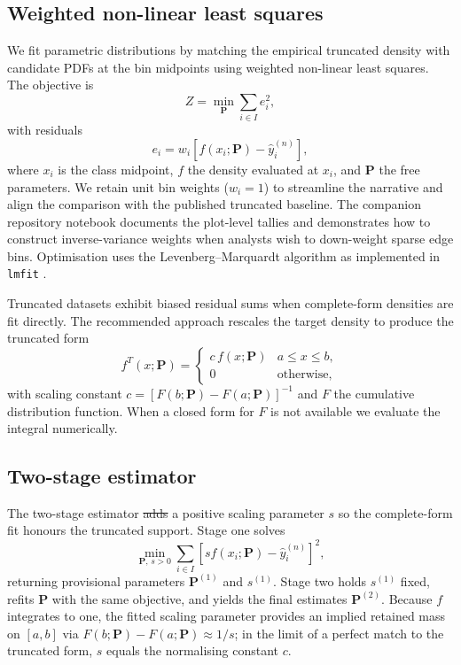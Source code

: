 \documentclass[12pt]{article}
\providecommand{\DIFaddtex}[1]{{\protect\color{blue}\uwave{#1}}} %
\providecommand{\DIFdeltex}[1]{{\protect\color{red}\sout{#1}}}                      %
\providecommand{\DIFaddbegin}{} %
\providecommand{\DIFaddend}{} %
\providecommand{\DIFdelbegin}{} %
\providecommand{\DIFdelend}{} %
\providecommand{\DIFadd}[1]{\texorpdfstring{\DIFaddtex{#1}}{#1}} %
\providecommand{\DIFdel}[1]{\texorpdfstring{\DIFdeltex{#1}}{}} %
\newcommand{\DIFscaledelfig}{0.5}
\newlength{\DIFdelgraphicswidth} %
\newlength{\DIFdelgraphicsheight} %
\newcommand{\DIFaddincludegraphics}[2][]{{\color{blue}\fbox{\DIFOincludegraphics[#1]{#2}}}} %
\newcommand{\DIFdelincludegraphics}[2][]{%
\sbox{\DIFdelgraphicsbox}{\DIFOincludegraphics[#1]{#2}}%
\settoboxwidth{\DIFdelgraphicswidth}{\DIFdelgraphicsbox} %
\settoboxtotalheight{\DIFdelgraphicsheight}{\DIFdelgraphicsbox} %
\scalebox{\DIFscaledelfig}{%
\parbox[b]{\DIFdelgraphicswidth}{\usebox{\DIFdelgraphicsbox}\\[-\baselineskip] \rule{\DIFdelgraphicswidth}{0em}}\llap{\resizebox{\DIFdelgraphicswidth}{\DIFdelgraphicsheight}{%
\setlength{\unitlength}{\DIFdelgraphicswidth}%
\begin{picture}(1,1)%
\thicklines\linethickness{2pt} %
{\color[rgb]{1,0,0}\put(0,0){\framebox(1,1){}}}%
{\color[rgb]{1,0,0}\put(0,0){\line( 1,1){1}}}%
{\color[rgb]{1,0,0}\put(0,1){\line(1,-1){1}}}%
\end{picture}%
}\hspace*{3pt}}} %
} %
\DeclareRobustCommand{\DIFaddbegin}{\DIFOaddbegin \let\includegraphics\DIFaddincludegraphics} %
\DeclareRobustCommand{\DIFaddend}{\DIFOaddend \let\includegraphics\DIFOincludegraphics} %
\DeclareRobustCommand{\DIFdelbegin}{\DIFOdelbegin \let\includegraphics\DIFdelincludegraphics} %
\DeclareRobustCommand{\DIFdelend}{\DIFOaddend \let\includegraphics\DIFOincludegraphics} %
\begin{document}
\subsection{Weighted non-linear least squares}
\label{sec:methods_nlls}

We fit parametric distributions by matching the empirical truncated density with candidate PDFs at the bin midpoints using weighted non-linear least squares. The objective is
\begin{equation}
  Z = \min_{\bm{P}} \sum_{i \in I} e_i^2,
\end{equation}
with residuals
\begin{equation}
  e_i = w_i \left[f(x_i; \bm{P}) - \hat{y}_i^{(n)}\right],
\end{equation}
where $x_i$ is the class midpoint, $f$ the density evaluated at $x_i$, and $\bm{P}$ the free parameters. We retain unit bin weights ($w_i = 1$) to streamline the narrative and align the comparison with the published truncated baseline. The companion repository notebook documents the plot-level tallies and demonstrates how to construct inverse-variance weights when analysts wish to down-weight sparse edge bins.
Optimisation uses the Levenberg--Marquardt algorithm as implemented in \texttt{lmfit} \citep{levenberg1944method, marquardt1963algorithm}.

Truncated datasets exhibit biased residual sums when complete-form densities are fit directly. The recommended approach rescales the target density to produce the truncated form
\begin{equation}
  f^{T}(x; \bm{P}) =
    \begin{cases}
      c\, f(x; \bm{P}) & a \leq x \leq b, \\
      0 & \text{otherwise},
    \end{cases}
\end{equation}
with scaling constant $c = [F(b; \bm{P}) - F(a; \bm{P})]^{-1}$ and $F$ the cumulative distribution function. When a closed form for $F$ is not available we evaluate the integral numerically.

\subsection{Two-stage estimator}
\label{sec:methods_twostage}

The two-stage estimator \DIFdelbegin \DIFdel{adds }\DIFdelend \DIFaddbegin \DIFadd{includes }\DIFaddend a positive scaling parameter $s$ so the complete-form fit honours the truncated support. Stage one solves
\begin{equation}
  \min_{\bm{P},\, s>0} \sum_{i \in I} \left[s f(x_i; \bm{P}) - \hat{y}_i^{(n)}\right]^2,
\end{equation}
returning provisional parameters $\bm{P}^{(1)}$ and $s^{(1)}$. Stage two holds $s^{(1)}$ fixed, refits $\bm{P}$ with the same objective, and yields the final estimates $\bm{P}^{(2)}$.
Because $f$ integrates to one, the fitted scaling parameter provides an implied retained mass on $[a,b]$ via $F(b;\bm{P})-F(a;\bm{P}) \approx 1/s$; in the limit of a perfect match to the truncated form, $s$ equals the normalising constant $c$.
\end{document}
